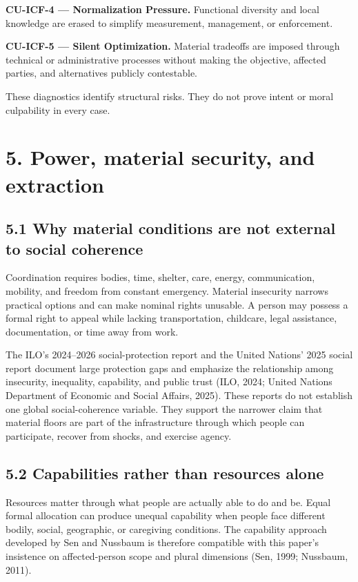 \documentclass[
  11pt,
]{article}
\begin{document}
\textbf{CU-ICF-4 --- Normalization Pressure.} Functional diversity and
local knowledge are erased to simplify measurement, management, or
enforcement.

\textbf{CU-ICF-5 --- Silent Optimization.} Material tradeoffs are
imposed through technical or administrative processes without making the
objective, affected parties, and alternatives publicly contestable.

These diagnostics identify structural risks. They do not prove intent or
moral culpability in every case.

\section{5. Power, material security, and
extraction}\label{power-material-security-and-extraction}

\subsection{5.1 Why material conditions are not external to social
coherence}\label{why-material-conditions-are-not-external-to-social-coherence}

Coordination requires bodies, time, shelter, care, energy,
communication, mobility, and freedom from constant emergency. Material
insecurity narrows practical options and can make nominal rights
unusable. A person may possess a formal right to appeal while lacking
transportation, childcare, legal assistance, documentation, or time away
from work.

The ILO's 2024--2026 social-protection report and the United Nations'
2025 social report document large protection gaps and emphasize the
relationship among insecurity, inequality, capability, and public trust
(ILO, 2024; United Nations Department of Economic and Social Affairs,
2025). These reports do not establish one global social-coherence
variable. They support the narrower claim that material floors are part
of the infrastructure through which people can participate, recover from
shocks, and exercise agency.

\subsection{5.2 Capabilities rather than resources
alone}\label{capabilities-rather-than-resources-alone}

Resources matter through what people are actually able to do and be.
Equal formal allocation can produce unequal capability when people face
different bodily, social, geographic, or caregiving conditions. The
capability approach developed by Sen and Nussbaum is therefore
compatible with this paper's insistence on affected-person scope and
plural dimensions (Sen, 1999; Nussbaum, 2011).
\end{document}
